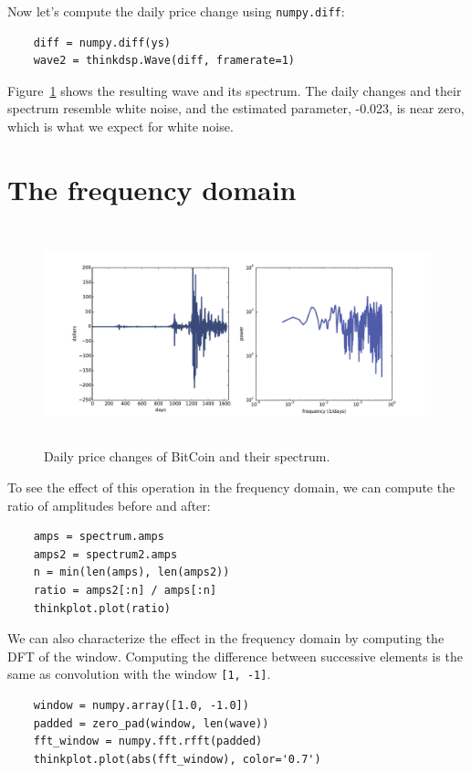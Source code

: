 \documentclass[12pt]{book}
\begin{document}
Now let's compute the daily price change using {\tt numpy.diff}:

\begin{verbatim}
    diff = numpy.diff(ys)
    wave2 = thinkdsp.Wave(diff, framerate=1)
\end{verbatim}

Figure~\ref{fig.systems2} shows the resulting wave and its
spectrum.  The daily changes and their spectrum resemble white noise,
and the estimated parameter, -0.023, is near zero, which is what
we expect for white noise.


\section{The frequency domain}

\begin{figure}
\centerline{\includegraphics[height=2.5in]{figs/systems2.pdf}}
\caption{Daily price changes of BitCoin and their spectrum.}
\label{fig.systems2}
\end{figure}

To see the effect of this operation in the frequency domain,
we can compute the ratio of amplitudes before and after:

\begin{verbatim}
    amps = spectrum.amps
    amps2 = spectrum2.amps
    n = min(len(amps), len(amps2))
    ratio = amps2[:n] / amps[:n]
    thinkplot.plot(ratio)
\end{verbatim}

We can also characterize the effect in the frequency domain
by computing the DFT of the window.  Computing the difference
between successive elements is the same as convolution with
the window {\tt [1, -1]}.

\begin{verbatim}
    window = numpy.array([1.0, -1.0])
    padded = zero_pad(window, len(wave))
    fft_window = numpy.fft.rfft(padded)
    thinkplot.plot(abs(fft_window), color='0.7')
\end{verbatim}
\end{document}
